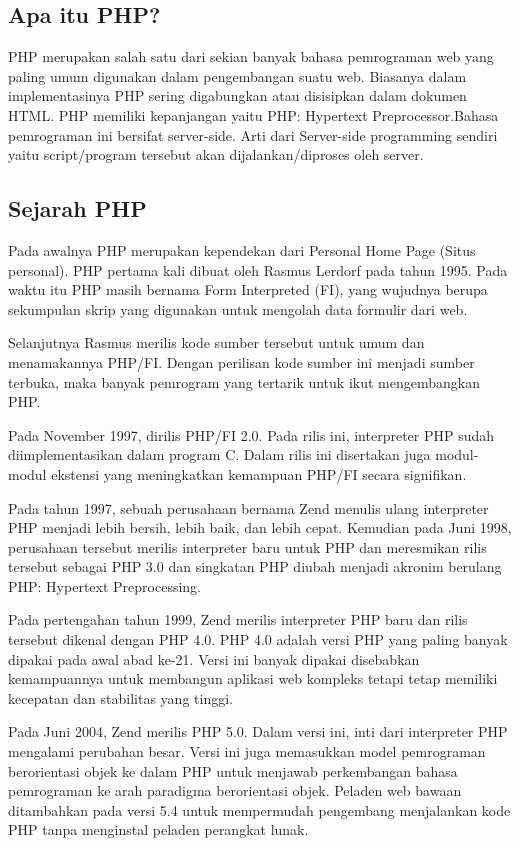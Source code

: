 \begin{enumerate}
\subsection{Apa itu PHP?}
PHP merupakan salah satu dari sekian banyak bahasa pemrograman web yang paling umum digunakan dalam pengembangan suatu web. Biasanya dalam implementasinya PHP sering digabungkan atau disisipkan dalam dokumen HTML. PHP memiliki kepanjangan yaitu PHP: Hypertext Preprocessor.Bahasa pemrograman ini bersifat server-side. Arti dari Server-side programming sendiri yaitu script/program tersebut akan dijalankan/diproses oleh server. 

\subsection{Sejarah PHP}
Pada awalnya PHP merupakan kependekan dari Personal Home Page (Situs personal). PHP pertama kali dibuat oleh Rasmus Lerdorf pada tahun 1995. Pada waktu itu PHP masih bernama Form Interpreted (FI), yang wujudnya berupa sekumpulan skrip yang digunakan untuk mengolah data formulir dari web.

Selanjutnya Rasmus merilis kode sumber tersebut untuk umum dan menamakannya PHP/FI. Dengan perilisan kode sumber ini menjadi sumber terbuka, maka banyak pemrogram yang tertarik untuk ikut mengembangkan PHP.

Pada November 1997, dirilis PHP/FI 2.0. Pada rilis ini, interpreter PHP sudah diimplementasikan dalam program C. Dalam rilis ini disertakan juga modul-modul ekstensi yang meningkatkan kemampuan PHP/FI secara signifikan.

Pada tahun 1997, sebuah perusahaan bernama Zend menulis ulang interpreter PHP menjadi lebih bersih, lebih baik, dan lebih cepat. Kemudian pada Juni 1998, perusahaan tersebut merilis interpreter baru untuk PHP dan meresmikan rilis tersebut sebagai PHP 3.0 dan singkatan PHP diubah menjadi akronim berulang PHP: Hypertext Preprocessing.

Pada pertengahan tahun 1999, Zend merilis interpreter PHP baru dan rilis tersebut dikenal dengan PHP 4.0. PHP 4.0 adalah versi PHP yang paling banyak dipakai pada awal abad ke-21. Versi ini banyak dipakai disebabkan kemampuannya untuk membangun aplikasi web kompleks tetapi tetap memiliki kecepatan dan stabilitas yang tinggi.

Pada Juni 2004, Zend merilis PHP 5.0. Dalam versi ini, inti dari interpreter PHP mengalami perubahan besar. Versi ini juga memasukkan model pemrograman berorientasi objek ke dalam PHP untuk menjawab perkembangan bahasa pemrograman ke arah paradigma berorientasi objek. Peladen web bawaan ditambahkan pada versi 5.4 untuk mempermudah pengembang menjalankan kode PHP tanpa menginstal peladen perangkat lunak.


\end{enumerate}

